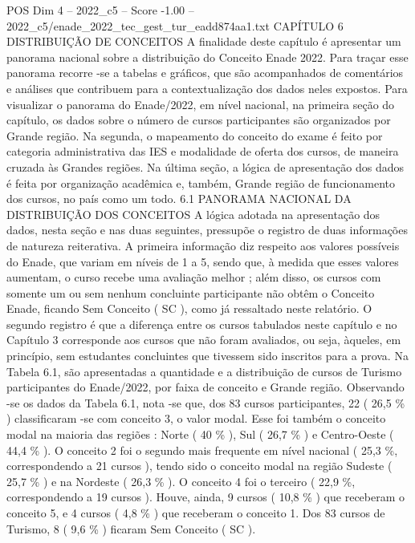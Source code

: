 \begin{textsample}{POS Dim 4 – 2022\_c5 – Score -1.00 – 2022\_c5/enade\_2022\_tec\_gest\_tur\_eadd874aa1.txt}  \label{ex:f4_pos_283}
CAPÍTULO 6 DISTRIBUIÇÃO DE CONCEITOS A finalidade deste capítulo é apresentar um panorama nacional sobre a distribuição do Conceito Enade 2022.
Para traçar esse panorama recorre -se a tabelas e gráficos, que são acompanhados de comentários e análises que contribuem para a contextualização dos dados neles expostos.
Para visualizar o panorama do Enade/2022, em nível nacional, na primeira seção do capítulo, os dados sobre o número de cursos participantes são organizados por Grande região.
Na segunda, o mapeamento do conceito do exame é feito por categoria administrativa das IES e modalidade de oferta dos cursos, de maneira cruzada às Grandes regiões.
Na última seção, a lógica de apresentação dos dados é feita por organização acadêmica e, também, Grande região de funcionamento dos cursos, no país como um todo. 6.1 PANORAMA NACIONAL DA DISTRIBUIÇÃO DOS CONCEITOS A lógica adotada na apresentação dos dados, nesta seção e nas duas seguintes, pressupõe o registro de duas informações de natureza reiterativa.
A primeira informação diz respeito aos valores possíveis do Enade, que variam em níveis de 1 a 5, sendo que, à medida que esses valores aumentam, o curso recebe uma avaliação melhor ; além disso, os cursos com somente um ou sem nenhum concluinte participante não obtêm o Conceito Enade, ficando Sem Conceito ( SC ), como já ressaltado neste relatório.
O segundo registro é que a diferença entre os cursos tabulados neste capítulo e no Capítulo 3 corresponde aos cursos que não foram avaliados, ou seja, àqueles, em princípio, sem estudantes concluintes que tivessem sido inscritos para a prova.
Na Tabela 6.1, são apresentadas a quantidade e a distribuição de cursos de Turismo participantes do Enade/2022, por faixa de conceito e Grande região.
Observando -se os dados da Tabela 6.1, nota -se que, dos 83 cursos participantes, 22 ( 26,5 \% ) classificaram -se com conceito 3, o valor modal.
Esse foi também o conceito modal na maioria das regiões : Norte ( 40 \% ), Sul ( 26,7 \% ) e Centro-Oeste ( 44,4 \% ).
O conceito 2 foi o segundo mais frequente em nível nacional ( 25,3 \%, correspondendo a 21 cursos ), tendo sido o conceito modal na região Sudeste ( 25,7 \% ) e na Nordeste ( 26,3 \% ).
O conceito 4 foi o terceiro ( 22,9 \%, correspondendo a 19 cursos ).
Houve, ainda, 9 cursos ( 10,8 \% ) que receberam o conceito 5, e 4 cursos ( 4,8 \% ) que receberam o conceito 1.
Dos 83 cursos de Turismo, 8 ( 9,6 \% ) ficaram Sem Conceito ( SC ).

\end{textsample}
